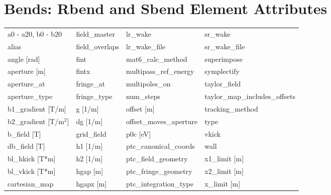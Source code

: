  \section{Bends: Rbend and Sbend Element Attributes}
 \label{s:list.bend}
 
 \begin{tabular}{llll} \toprule
a0 - a20, b0 - b20               & field_master                     & lr_wake                          & sr_wake                          \\
alias                            & field_overlaps                   & lr_wake_file                     & sr_wake_file                     \\
angle [rad]                      & fint                             & mat6_calc_method                 & superimpose                      \\
aperture [m]                     & fintx                            & multipass_ref_energy             & symplectify                      \\
aperture_at                      & fringe_at                        & multipoles_on                    & taylor_field                     \\
aperture_type                    & fringe_type                      & num_steps                        & taylor_map_includes_offsets      \\
b1_gradient [T/m]                & g [1/m]                          & offset [m]                       & tracking_method                  \\
b2_gradient [T/m$^2$]            & dg [1/m]                      & offset_moves_aperture            & type                             \\
b_field [T]                      & grid_field                       & p0c [eV]                         & vkick                            \\
db_field [T]                  & h1 [1/m]                         & ptc_canonical_coords             & wall                             \\
bl_hkick [T*m]                   & h2 [1/m]                         & ptc_field_geometry               & x1_limit [m]                     \\
bl_vkick [T*m]                   & hgap [m]                         & ptc_fringe_geometry              & x2_limit [m]                     \\
cartesian_map                    & hgapx [m]                        & ptc_integration_type             & x_limit [m]                      \\

\end{tabular}
